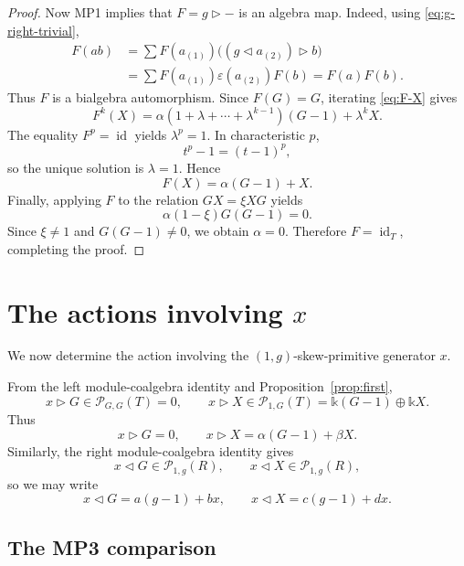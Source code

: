 \documentclass[twoside,11pt]{amsart}
\newcommand{\K}{\mathds{k}}
\newcommand{\Pp}{\mathcal{P}}
\newcommand{\id}{\operatorname{id}}
\begin{document}
\begin{proof}
		Now MP1 implies that $F=g\triangleright-$ is an algebra map. Indeed, using
		\eqref{eq:g-right-trivial},
		\[
		\begin{aligned}
			F(ab)
			&=\sum F(a_{(1)})
			\bigl((g\triangleleft a_{(2)})\triangleright b\bigr)\\
			&=\sum F(a_{(1)})\varepsilon(a_{(2)})F(b)
			=F(a)F(b).
		\end{aligned}
		\]
		Thus $F$ is a bialgebra automorphism. Since $F(G)=G$, iterating
		\eqref{eq:F-X} gives
		\[
		F^k(X)
		=\alpha(1+\lambda+\cdots+\lambda^{k-1})(G-1)+\lambda^kX.
		\]
		The equality $F^p=\id$ yields $\lambda^p=1$. In characteristic $p$,
		\[
		t^p-1=(t-1)^p,
		\]
		so the unique solution is $\lambda=1$. Hence
		\[
		F(X)=\alpha(G-1)+X.
		\]
		Finally, applying $F$ to the relation $GX=\xi XG$ yields
		\[
		\alpha(1-\xi)G(G-1)=0.
		\]
		Since $\xi\ne1$ and $G(G-1)\ne0$, we obtain $\alpha=0$. Therefore
		$F=\id_T$, completing the proof.
	\end{proof}
	
	\section{The actions involving \texorpdfstring{$x$}{x}}\label{sec:second}
	
	We now determine the action involving the $(1,g)$-skew-primitive generator $x$.
	
	From the left module-coalgebra identity and Proposition~\ref{prop:first},
	\[
	x\triangleright G\in\Pp_{G,G}(T)=0,
	\qquad
	x\triangleright X\in\Pp_{1,G}(T)
	=\K(G-1)\oplus\K X.
	\]
	Thus
	\begin{equation}\label{eq:x-left-initial}
		x\triangleright G=0,
		\qquad
		x\triangleright X=\alpha(G-1)+\beta X.
	\end{equation}
	Similarly, the right module-coalgebra identity gives
	\[
	x\triangleleft G\in\Pp_{1,g}(R),
	\qquad
	x\triangleleft X\in\Pp_{1,g}(R),
	\]
	so we may write
	\begin{equation}\label{eq:x-right-initial}
		x\triangleleft G=a(g-1)+bx,
		\qquad
		x\triangleleft X=c(g-1)+dx.
	\end{equation}
	
	\subsection{The MP3 comparison}
	
\end{document}
